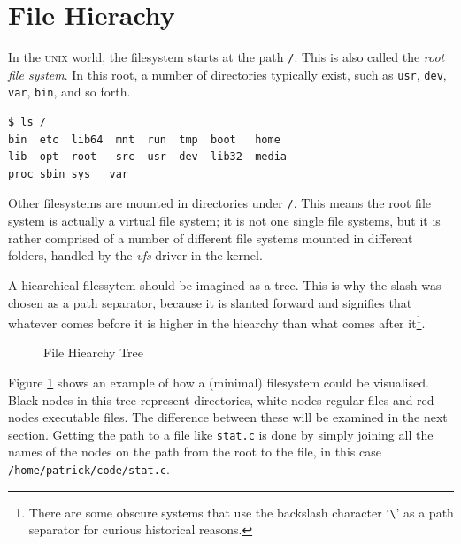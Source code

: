 \documentclass[a4paper]{article}
\begin{document}
\section{File Hierachy}

In the \textsc{unix} world, the filesystem starts at the path \verb|/|. This is also called the \emph{root file system}. In this root, a number of directories typically exist, such as \verb|usr|, \verb|dev|, \verb|var|, \verb|bin|, and so forth.

\begin{verbatim}
$ ls /
bin  etc  lib64  mnt  run  tmp  boot   home 
lib  opt  root   src  usr  dev  lib32  media 
proc sbin sys   var
\end{verbatim}
Other filesystems are mounted in directories under \verb|/|. This means the root file system is actually a virtual file system; it is not one single file systems, but it is rather comprised of a number of different file systems mounted in different folders, handled by the \emph{vfs} driver in the kernel.

A hiearchical filessytem should be imagined as a tree. This is why the slash was chosen as a path separator, because it is slanted forward and signifies that whatever comes before it is higher in the hiearchy than what comes after it\footnote{There are some obscure systems that use the backslash character ‘\texttt{\textbackslash}’ as a path separator for curious historical reasons.}.
\begin{figure}[!h]
\centering
{}
\caption{File Hiearchy Tree}\label{fig:fstree}
\end{figure}
Figure \ref{fig:fstree} shows an example of how a (minimal) filesystem could be visualised. Black nodes in this tree represent directories, white nodes regular files and red nodes executable files. The difference between these will be examined in the next section. Getting the path to a file like \verb|stat.c| is done by simply joining all the names of the nodes on the path from the root to the file, in this case \verb|/home/patrick/code/stat.c|.
\end{document}
